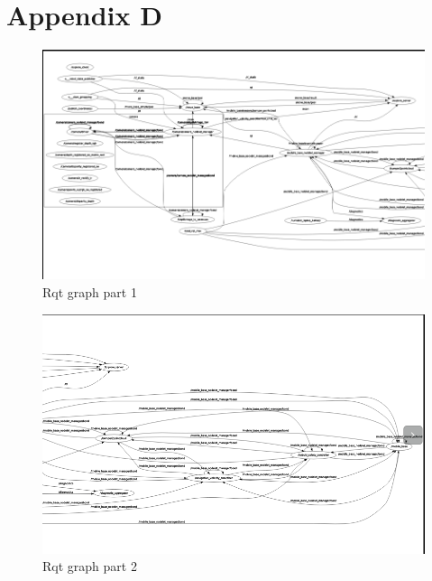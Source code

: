 \chapter{Appendix D}\label{ch:rqtgraph}
\begin{figure}[h]
\centering
    \includegraphics[width=\textwidth]{figures/rqtpart1.png}
\caption{Rqt graph part 1}
\label{fig:rqt}
\end{figure}
\begin{figure}[h]
\centering
    \includegraphics[width=\textwidth]{figures/rqtpart2.png} 
\caption{Rqt graph part 2}
\label{fig:rqt}
\end{figure}
